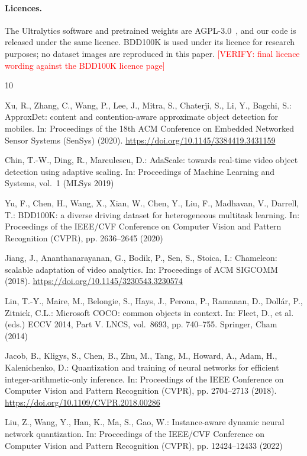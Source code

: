 \documentclass{svproc}
\newcommand{\VERIFY}[1]{\textcolor{red}{[VERIFY: #1]}}
\begin{document}
\paragraph{Licences.} The Ultralytics software and pretrained weights are AGPL-3.0~\cite{ultralytics}, and our code is released
under the same licence. BDD100K is used under its licence for research purposes; no dataset images are reproduced in this paper.
\VERIFY{final licence wording against the BDD100K licence page}

\begin{thebibliography}{10}
\providecommand{\doi}[1]{\url{https://doi.org/#1}}

Xu, R., Zhang, C., Wang, P., Lee, J., Mitra, S., Chaterji, S., Li, Y., Bagchi, S.:
ApproxDet: content and contention-aware approximate object detection for mobiles.
In: Proceedings of the 18th ACM Conference on Embedded Networked Sensor Systems (SenSys) (2020).
\doi{10.1145/3384419.3431159}

Chin, T.-W., Ding, R., Marculescu, D.:
AdaScale: towards real-time video object detection using adaptive scaling.
In: Proceedings of Machine Learning and Systems, vol.~1 (MLSys 2019)

Yu, F., Chen, H., Wang, X., Xian, W., Chen, Y., Liu, F., Madhavan, V., Darrell, T.:
BDD100K: a diverse driving dataset for heterogeneous multitask learning.
In: Proceedings of the IEEE/CVF Conference on Computer Vision and Pattern Recognition (CVPR), pp. 2636--2645 (2020)

Jiang, J., Ananthanarayanan, G., Bodik, P., Sen, S., Stoica, I.:
Chameleon: scalable adaptation of video analytics.
In: Proceedings of ACM SIGCOMM (2018). \doi{10.1145/3230543.3230574}

Lin, T.-Y., Maire, M., Belongie, S., Hays, J., Perona, P., Ramanan, D., Doll\'ar, P., Zitnick, C.L.:
Microsoft COCO: common objects in context.
In: Fleet, D., et al. (eds.) ECCV 2014, Part V. LNCS, vol.~8693, pp. 740--755. Springer, Cham (2014)

Jacob, B., Kligys, S., Chen, B., Zhu, M., Tang, M., Howard, A., Adam, H., Kalenichenko, D.:
Quantization and training of neural networks for efficient integer-arithmetic-only inference.
In: Proceedings of the IEEE Conference on Computer Vision and Pattern Recognition (CVPR), pp. 2704--2713 (2018).
\doi{10.1109/CVPR.2018.00286}

Liu, Z., Wang, Y., Han, K., Ma, S., Gao, W.:
Instance-aware dynamic neural network quantization.
In: Proceedings of the IEEE/CVF Conference on Computer Vision and Pattern Recognition (CVPR), pp. 12424--12433 (2022)


\end{thebibliography}
\end{document}
